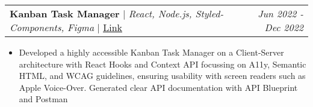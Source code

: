 \documentclass[letterpaper]{article}
\makeatletter
\newcommand{\resumeItemWithoutTitle}[1]{
  \item{
    {#1 \vspace{-4pt}}
  }
}
\newcommand{\projectHeading}[4]{
  \begin{tabular*}{\textwidth}{l@{\extracolsep{\fill}}r}
        \textbf{#1} 
        \hspace{-2pt} $\vert$ \hspace{-2pt} {\textit{#2}} 
        \hspace{-2pt} $\vert$ \hspace{-2pt} \href{#3}{ \underline{Link}}
        &
        \textit{#4} \\
    \end{tabular*}\vspace{-2pt}
}
\newcommand{\projectHeadingWithoutLink}[3]{
  \begin{tabular*}{\textwidth}{l@{\extracolsep{\fill}}r}
        \textbf{#1} 
        \hspace{-2pt} $\vert$ \hspace{-2pt} {\textit{#2}}
        & 
        \textit{#3} \\
    \end{tabular*}\vspace{-2pt}
}
\newcommand{\resumeItemListStart}{\begin{itemize}}
\newcommand{\resumeItemListEnd}{\end{itemize}}
\makeatother
\begin{document}
\vspace{3pt}
\projectHeading {Kanban Task Manager}{React, Node.js, Styled-Components, Figma}{https://kanbhan.netlify.app}{Jun 2022 - Dec 2022}
\resumeItemListStart
\resumeItemWithoutTitle{Developed a highly accessible Kanban Task Manager on a Client-Server architecture with React Hooks and Context API focussing on A11y, Semantic HTML, and WCAG guidelines, ensuring usability with screen readers such as Apple Voice-Over. Generated clear API documentation with API Blueprint and Postman}
\resumeItemListEnd







\end{document}
